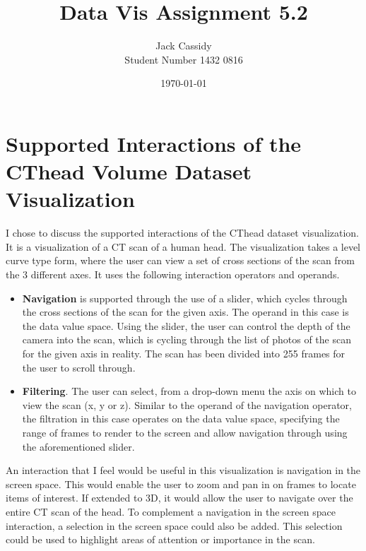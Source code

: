 \documentclass[12pt]{article}
\begin{document}
\title{Data Vis Assignment 5.2}
\author{Jack Cassidy \\ Student Number 1432 0816}
\date{\today}
\maketitle
\section*{Supported Interactions of the CThead Volume Dataset Visualization}
I chose to discuss the supported interactions of the CThead dataset visualization. It is a visualization of a CT scan of a human head. The visualization takes a level curve type form, where the user can view a set of cross sections of the scan from the 3 different axes. It uses the following interaction operators and operands.
\begin{itemize}
    \item \textbf{Navigation} is supported through the use of a slider, which cycles through the cross sections of the scan for the given axis. The operand in this case is the data value space. Using the slider, the user can control the depth of the camera into the scan, which is cycling through the list of photos of the scan for the given axis in reality. The scan has been divided into 255 frames for the user to scroll through.

    \item \textbf{Filtering}. The user can select, from a drop-down menu the axis on which to view the scan (x, y or z). Similar to the operand of the navigation operator, the filtration in this case operates on the data value space, specifying the range of frames to render to the screen and allow navigation through using the aforementioned slider.
\end{itemize}
An interaction that I feel would be useful in this visualization is navigation in the screen space. This would enable the user to zoom and pan in on frames to locate items of interest. If extended to 3D, it would allow the user to navigate over the entire CT scan of the head. To complement a navigation in the screen space interaction, a selection in the screen space could also be added. This selection could be used to highlight areas of attention or importance in the scan.
\end{document}
